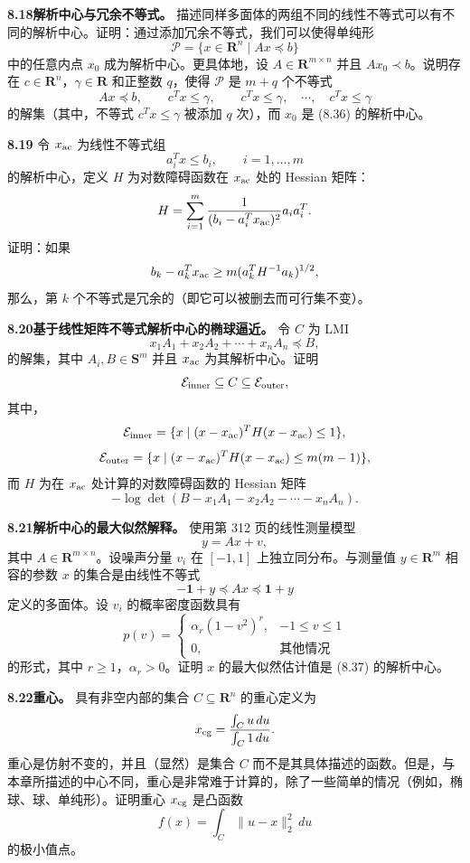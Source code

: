 \documentclass[UTF8, 12pt, fontset=fandol, oneside]{ctexart}
\begin{document}
\noindent\textbf{8.18\quad 解析中心与冗余不等式。}
描述同样多面体的两组不同的线性不等式可以有不同的解析中心。证明：通过添加冗余不等式，我们可以使得单纯形
\[
\mathcal P=\{x\in\mathbf{R}^n\mid Ax\preceq b\}
\]
中的任意内点 $x_0$ 成为解析中心。更具体地，设 $A\in\mathbf{R}^{m\times n}$ 并且 $Ax_0\prec b$。说明存在 $c\in\mathbf{R}^n$，$\gamma\in\mathbf{R}$ 和正整数 $q$，使得 $\mathcal P$ 是 $m+q$ 个不等式
\[
Ax\preceq b,\qquad c^Tx\leq \gamma,\qquad c^Tx\leq \gamma,\quad \cdots,\quad c^Tx\leq \gamma
\tag{8.36}
\]
的解集（其中，不等式 $c^Tx\leq \gamma$ 被添加 $q$ 次），而 $x_0$ 是 (8.36) 的解析中心。

\noindent\textbf{8.19}
令 $x_{\rm ac}$ 为线性不等式组
\[
a_i^Tx\leq b_i,\qquad i=1,\ldots,m
\]
的解析中心，定义 $H$ 为对数障碍函数在 $x_{\rm ac}$ 处的 Hessian 矩阵：
\[
H=\sum_{i=1}^m\frac{1}{(b_i-a_i^Tx_{\rm ac})^2}a_ia_i^T.
\]
证明：如果
\[
b_k-a_k^Tx_{\rm ac}\geq m(a_k^TH^{-1}a_k)^{1/2},
\]
那么，第 $k$ 个不等式是冗余的（即它可以被删去而可行集不变）。

\noindent\textbf{8.20\quad 基于线性矩阵不等式解析中心的椭球逼近。}
令 $C$ 为 LMI
\[
x_1A_1+x_2A_2+\cdots+x_nA_n\preceq B,
\]
的解集，其中 $A_i,B\in\mathbf{S}^m$ 并且 $x_{\rm ac}$ 为其解析中心。证明
\[
\mathcal E_{\rm inner}\subseteq C\subseteq \mathcal E_{\rm outer},
\]
其中，
\[
\mathcal E_{\rm inner}=\{x\mid (x-x_{\rm ac})^TH(x-x_{\rm ac})\leq 1\},
\]
\[
\mathcal E_{\rm outer}=\{x\mid (x-x_{\rm ac})^TH(x-x_{\rm ac})\leq m(m-1)\},
\]
而 $H$ 为在 $x_{\rm ac}$ 处计算的对数障碍函数的 Hessian 矩阵
\[
-\log\det(B-x_1A_1-x_2A_2-\cdots-x_nA_n).
\]

\noindent\textbf{8.21\quad [BYT99] 解析中心的最大似然解释。}
使用第 312 页的线性测量模型
\[
y=Ax+v,
\]
其中 $A\in\mathbf{R}^{m\times n}$。设噪声分量 $v_i$ 在 $[-1,1]$ 上独立同分布。与测量值 $y\in\mathbf{R}^m$ 相容的参数 $x$ 的集合是由线性不等式
\[
-\mathbf{1}+y\preceq Ax\preceq \mathbf{1}+y
\tag{8.37}
\]
定义的多面体。设 $v_i$ 的概率密度函数具有
\[
p(v)=
\begin{cases}
\alpha_r(1-v^2)^r, & -1\leq v\leq 1\\
0, & \mbox{其他情况}
\end{cases}
\]
的形式，其中 $r\geq 1$，$\alpha_r>0$。证明 $x$ 的最大似然估计值是 (8.37) 的解析中心。

\noindent\textbf{8.22\quad 重心。}
具有非空内部的集合 $C\subseteq\mathbf{R}^n$ 的重心定义为
\[
x_{\rm cg}=\frac{\int_C u\,du}{\int_C 1\,du}.
\]
重心是仿射不变的，并且（显然）是集合 $C$ 而不是其具体描述的函数。但是，与本章所描述的中心不同，重心是非常难于计算的，除了一些简单的情况（例如，椭球、球、单纯形）。证明重心 $x_{\rm cg}$ 是凸函数
\[
f(x)=\int_C\|u-x\|_2^2\,du
\]
的极小值点。
\end{document}
